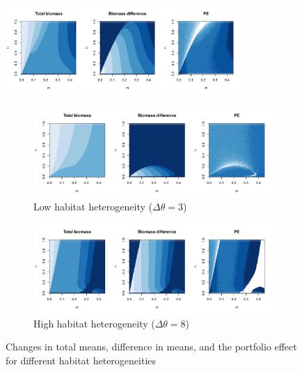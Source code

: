 \documentclass[onecolumn,preprintnumbers,amsmath,amssymb,superscriptaddress]{revtex4}
\begin{document}
\begin{figure}[h]
\centering
\includegraphics[width=0.8\textwidth]{figs/fig_MDPE_hm.pdf}
\caption{} \label{fig:PE}
\end{figure}



\begin{figure}
\centering
\begin{subfigure}[t]{0.8\textwidth}
\centering
\includegraphics[width=\textwidth]{figs/fig_MDPE_hm_theta3.pdf} 
\caption{Low habitat heterogeneity ($\Delta\theta=3$)} \label{fig:hetero1}
\end{subfigure}

\begin{subfigure}[t]{0.8\textwidth}
\centering
\includegraphics[width=\textwidth]{figs/fig_MDPE_hm_theta8.pdf} 
\caption{High habitat heterogeneity ($\Delta\theta=8$)} \label{fig:hetero2}
\end{subfigure}

 \caption{Changes in total means, difference in means, and the portfolio effect for different habitat heterogeneities}

\end{figure}
\end{document}

